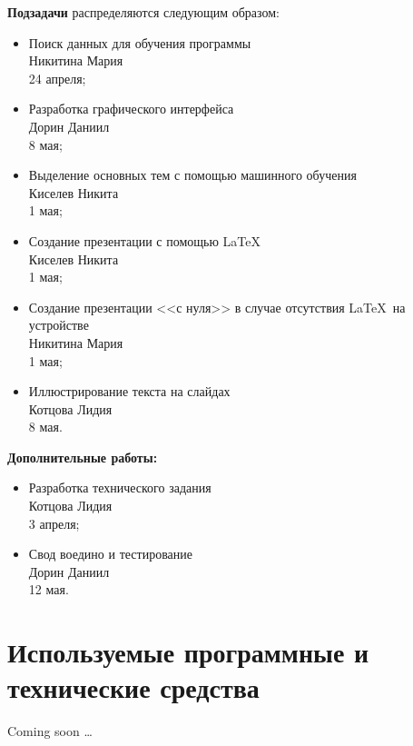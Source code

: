  \textbf{Подзадачи} распределяются следующим образом:
  \begin{itemize}
    \item Поиск данных для обучения программы \\ Никитина Мария \\ 24 апреля;
    \item Разработка графического интерфейса \\ Дорин Даниил \\ 8 мая;
    \item Выделение основных тем с помощью машинного обучения \\ Киселев Никита \\ 1 мая;
    \item Создание презентации с помощью \LaTeX \\ Киселев Никита \\ 1 мая;
    \item Создание презентации <<с нуля>> в случае отсутствия \LaTeX~на устройстве \\ Никитина Мария \\ 1 мая;
    \item Иллюстрирование текста на слайдах \\ Котцова Лидия \\ 8 мая.
  \end{itemize}

  \textbf{Дополнительные работы:}
  \begin{itemize}
    \item Разработка технического задания \\ Котцова Лидия \\ 3 апреля;
    \item Свод воедино и тестирование \\ Дорин Даниил \\ 12 мая.
  \end{itemize}

  \section{Используемые программные и технические средства}

  \begin{center}
    Coming soon \ldots
  \end{center}

